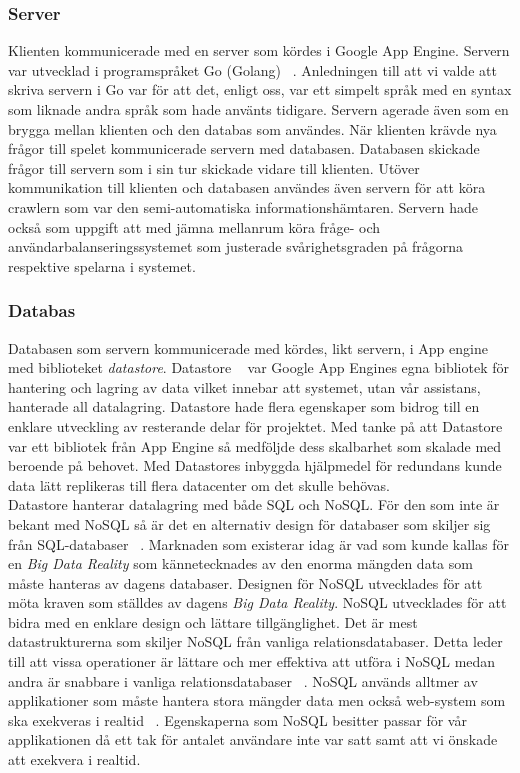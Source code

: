 \documentclass[a4paper, 11pt]{article}
\begin{document}
\subsubsection{Server}
Klienten kommunicerade med en server som kördes i Google App Engine. Servern var utvecklad i programspråket Go (Golang) ~\cite{golang}. Anledningen till att vi valde att skriva servern i Go var för att det, enligt oss, var ett simpelt språk med en syntax som liknade andra språk som hade använts tidigare. Servern agerade även som en brygga mellan klienten och den databas som användes. När klienten krävde nya frågor till spelet kommunicerade servern med databasen. Databasen skickade frågor till servern som i sin tur skickade vidare till klienten. Utöver kommunikation till klienten och databasen användes även servern för att köra crawlern som var den semi-automatiska informationshämtaren. Servern hade också som uppgift att med jämna mellanrum köra fråge- och användarbalanseringssystemet som justerade svårighetsgraden på frågorna respektive spelarna i systemet. 

\subsubsection{Databas}
Databasen som servern kommunicerade med kördes, likt servern, i App engine med biblioteket \textit{datastore}. Datastore ~\cite{datastore} var Google App Engines egna bibliotek för hantering och lagring av data vilket innebar att systemet, utan vår assistans, hanterade all datalagring. Datastore hade flera egenskaper som bidrog till en enklare utveckling av resterande delar för projektet. Med tanke på att Datastore var ett bibliotek från App Engine så medföljde dess skalbarhet som skalade med beroende på behovet. Med Datastores inbyggda hjälpmedel för redundans kunde data lätt replikeras till flera datacenter om det skulle behövas. \\
Datastore hanterar datalagring med både SQL och NoSQL. För den som inte är bekant med NoSQL så är det en alternativ design för databaser som skiljer sig från SQL-databaser ~\cite{nosql}. Marknaden som existerar idag är vad som kunde kallas för en \textit{Big Data Reality} som kännetecknades av den enorma mängden data som måste hanteras av dagens databaser. Designen för NoSQL utvecklades för att möta kraven som ställdes av dagens \textit{Big Data Reality}. NoSQL utvecklades för att bidra med en enklare design och lättare tillgänglighet. Det är mest datastrukturerna som skiljer NoSQL från vanliga relationsdatabaser. Detta leder till att vissa operationer är lättare och mer effektiva att utföra i NoSQL medan andra är snabbare i vanliga relationsdatabaser ~\cite[1--3]{nosqlfacts}. NoSQL används alltmer av applikationer som måste hantera stora mängder data men också web-system som ska exekveras i realtid ~\cite{nosqlcloud}. Egenskaperna som NoSQL besitter passar för vår applikationen då ett tak för antalet användare inte var satt samt att vi önskade att exekvera i realtid.
\end{document}
